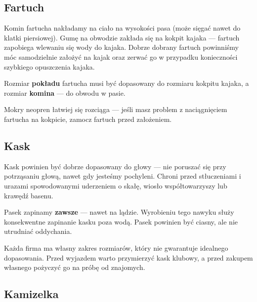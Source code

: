 \subsection{Fartuch}

Komin fartucha nakładamy na ciało na wysokości pasa (może sięgać nawet do klatki piersiowej). Gumę na obwodzie zakłada się na kokpit kajaka — fartuch zapobiega wlewaniu się wody do kajaka. Dobrze dobrany fartuch powinniśmy móc samodzielnie założyć na kajak oraz zerwać go w przypadku konieczności szybkiego opuszczenia kajaka. 

Rozmiar \textbf{pokładu} fartucha musi być dopasowany do rozmiaru kokpitu kajaka, a rozmiar \textbf{komina} — do obwodu w pasie.

\begin{tipbox}
  Mokry neopren łatwiej się rozciąga — jeśli masz problem z naciągnięciem fartucha na kokpicie, zamocz fartuch przed założeniem.
\end{tipbox}

\subsection{Kask}

Kask powinien być dobrze dopasowany do głowy — nie poruszać się przy potrząsaniu głową, nawet gdy jesteśmy pochyleni. Chroni przed stłuczeniami i urazami spowodowanymi uderzeniem o skałę, wiosło współtowarzyszy lub krawędź basenu.

Pasek zapinamy \textbf{zawsze} — nawet na lądzie. Wyrobieniu tego nawyku służy konsekwentne zapinanie kasku poza wodą. Pasek powinien być ciasny, ale nie utrudniać oddychania.

\begin{tipbox}
  Każda firma ma własny zakres rozmiarów, który nie gwarantuje idealnego dopasowania. Przed wyjazdem warto przymierzyć kask klubowy, a przed zakupem własnego pożyczyć go na próbę od znajomych.
\end{tipbox}

\subsection{Kamizelka}

